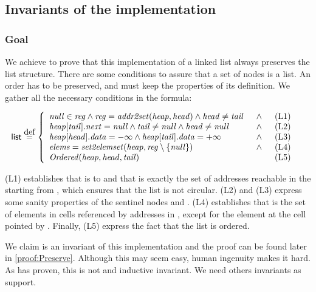 \subsection{Invariants of the implementation}

\subsubsection{Goal}

We achieve to prove that this implementation of a linked list always preserves the list structure. 
%
There are some conditions to assure that a set of nodes is a list.
%
An order has to be preserved, \head and \tail must keep the properties of its definition. 
%
We gather all the necessary conditions in the formula:


	\begin{align*}
	  	\invPreserve & \overset{\mbox{def}}{=} \formulaFullListReducedBody
	\end{align*}

(L1) establishes that \fNull is to \region and that \region is
exactly the set of addresses reachable in the \heap starting from
\head, which ensures that the list is not circular.
%
(L2) and (L3) express some sanity properties of the sentinel nodes
\head and \tail.
%
(L4) establishes that \elements is the set of elements in cells 
referenced by addresses in \region, except for the element at the cell 
pointed by \fNull.
%
Finally, (L5) express the fact that the list is ordered.

We claim \invPreserve is an invariant of this implementation and the proof can be found later in \ref{proof:Preserve}. 
%
Although this may seem easy, human ingenuity makes it hard. 
%
As  has proven, this is not and inductive invariant. 
%
We need others invariants as support.

\label{invariants}

